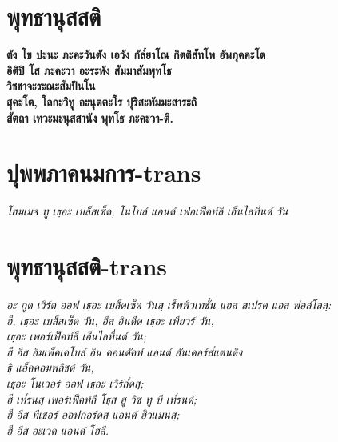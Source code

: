 \chapter{พุทธานุสสติ}
\begin{leader}
\end{leader}

\textbf{ตัง โข ปะนะ ภะคะวันตัง เอวัง กัล๎ยาโณ กิตติสัทโท อัพภุคคะโต}\\
\textbf{อิติปิ โส ภะคะวา อะระหัง สัมมาสัมพุทโธ}\\
\textbf{วิชชาจะระณะสัมปันโน}\\
\textbf{สุคะโต, โลกะวิทู อะนุตตะโร ปุริสะทัมมะสาระถิ}\\
\textbf{สัตถา เทวะมะนุสสานัง พุทโธ ภะคะวา-ติ.}\\

\chapter{ปุพพภาคนมการ-trans}

\begin{leader}
\end{leader}
\textit{โฮมเมจ ทู เธฺอะ เบล็สเซ็ด, โนโบล์ แอนด์ เฟอเฟ็คท์ลี เอ็นไลทึ่นด์ วัน}

\chapter{พุทธานุสสติ-trans}

\begin{leader}
\end{leader}

\textit{อะ กูด เวิร์ด ออฟ เธฺอะ เบล็ดเซ็ด วันสฺ เร็พพิวเทชั่น แฮส สเปรด แอส ฟอล์โลสฺ:\\
ฮี, เธฺอะ เบล็สเซ็ด วัน, อีส อินดีด เธฺอะ เพียวร์ วัน,\\
เธฺอะ เพอร์เฟ็คท์ลี เอ็นไลทึ่นด์ วัน;\\
ฮี อีส อิมเพ็คเคโบล์ อิน คอนดัคท์ แอนด์ อันเดอร์ส๎แตนดิง\\
ธฺิ แอ็คคอมพลิชด์ วัน,\\
เธฺอะ โนเวอร์ ออฟ เธฺอะ เวิร์ล๎ดสฺ;\\
ฮี เท๎รนสฺ เพอร์เฟ็คท์ลี โธฺส ฮู วิซ ทู บี เท๎รนด์;\\
ฮี อีส ทีเชอร์ ออฟกอร์ดสฺ แอนด์ ฮิวแมนสฺ;\\
ฮี อีส อะเวค แอนด์ โฮลี.\\}

